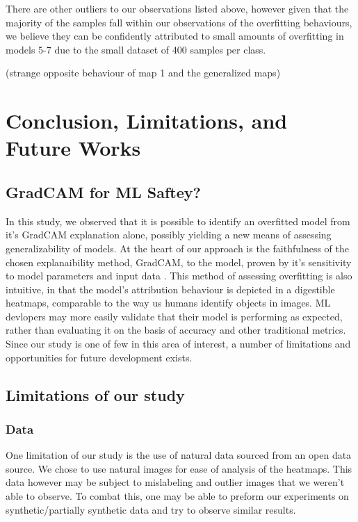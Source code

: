 \documentclass[conference]{IEEEtran}
\begin{document}
There are other outliers to our observations listed above, however given that the majority of the samples fall within our observations of the overfitting behaviours, we believe they can be confidently attributed to small amounts of overfitting in models 5-7 due to the small dataset of 400 samples per class.

(strange opposite behaviour of map 1 and the generalized maps)
\section{Conclusion, Limitations, and Future Works}
\label{discussion}
\subsection{GradCAM for ML Saftey?}
In this study, we observed that it is possible to identify an overfitted model from it's GradCAM explanation alone, possibly yielding a new means of assessing generalizability of models. At the heart of our approach is the faithfulness of the chosen explanaibility method, GradCAM, to the model, proven by it's sensitivity to model parameters and input data \cite{sanity}. This method of assessing overfitting is also intuitive, in that the model's attribution behaviour is depicted in a digestible heatmaps, comparable to the way us humans identify objects in images. ML devlopers may more easily validate that their model is performing as expected, rather than evaluating it on the basis of accuracy and other traditional metrics. Since our study is one of few in this area of interest, a number of limitations and opportunities for future development exists. 


\subsection{Limitations of our study}
\subsubsection{Data}
One limitation of our study is the use of natural data sourced from an open data source. We chose to use natural images for ease of analysis of the heatmaps. This data however may be subject to mislabeling and outlier images that we weren't able to observe. To combat this, one may be able to preform our experiments on synthetic/partially synthetic data and try to observe similar results.
\end{document}
